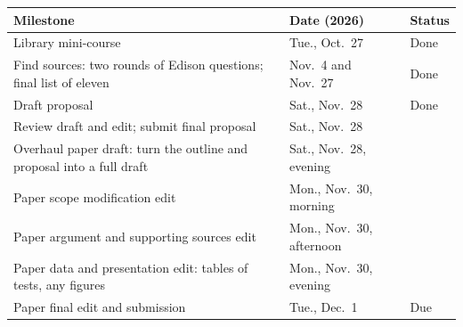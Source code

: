 \begin{center}
\small
\begin{tabularx}{\linewidth}{@{}>{\raggedright\arraybackslash}X l l@{}}
  \toprule
  Milestone & Date (2026) & Status \\
  \midrule
  Library mini-course & Tue., Oct.~27 & Done \\
  Find sources: two rounds of Edison questions; final list of eleven & Nov.~4 and Nov.~27
    & Done \\
  Draft proposal & Sat., Nov.~28 & Done \\
  Review draft and edit; submit final proposal & Sat., Nov.~28 & \\
  Overhaul paper draft: turn the outline and proposal into a full draft & Sat., Nov.~28,
    evening & \\
  Paper scope modification edit & Mon., Nov.~30, morning & \\
  Paper argument and supporting sources edit & Mon., Nov.~30, afternoon & \\
  Paper data and presentation edit: tables of tests, any figures & Mon., Nov.~30, evening
    & \\
  Paper final edit and submission & Tue., Dec.~1 & Due \\
  \bottomrule
\end{tabularx}
\end{center}
